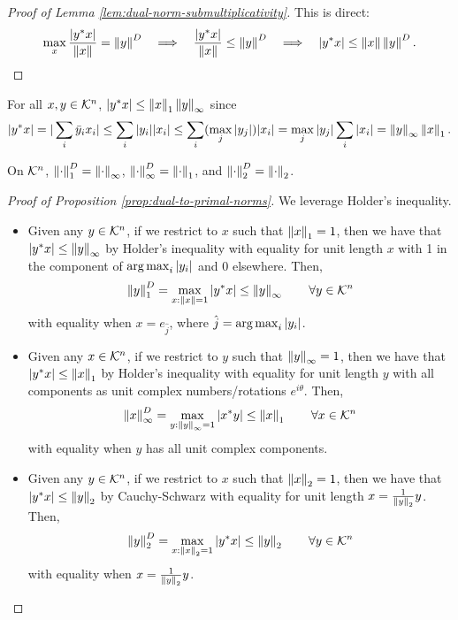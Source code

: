 \begin{proof}[Proof of Lemma \ref{lem:dual-norm-submultiplicativity}]
This is direct:
$$
\max_x \frac{|y^*x|}{\left\lVert x\right\rVert} = \left\lVert y\right\rVert^D \quad \Longrightarrow \quad \frac{|y^*x|}{\left\lVert x\right\rVert} \leq \left\lVert y\right\rVert^D \quad \Longrightarrow \quad |y^*x| \leq \left\lVert x\right\rVert\left\lVert y\right\rVert^D.
$$
\end{proof}

\begin{fact}
\label{fact:holders-inequality}
For all $x,y \in \mathcal{K}^n$, $|y^*x| \leq \left\lVert x\right\rVert_1 \left\lVert y\right\rVert_\infty$ since 
$$
|y^*x| = |\sum_{i}\Bar{y}_ix_i| \leq \sum_{i}|y_i||x_i| \leq \sum_i (\max_j |y_j|)|x_i| = \max_j|y_j| \sum_i |x_i| = \left\lVert y\right\rVert_\infty \left\lVert x\right\rVert_1.
$$
\end{fact}

\begin{proposition}
\label{prop:dual-to-primal-norms}
On $\mathcal{K}^n$, $\left\lVert\cdot\right\rVert_1^D = \left\lVert\cdot\right\rVert_\infty$, $\left\lVert\cdot\right\rVert_\infty^D = \left\lVert\cdot\right\rVert_1$, and $\left\lVert\cdot\right\rVert_2^D = \left\lVert\cdot\right\rVert_2$.
\end{proposition}

\begin{proof}[Proof of Proposition \ref{prop:dual-to-primal-norms}]
We leverage Holder's inequality.
\begin{itemize}
    \item Given any $y \in \mathcal{K}^n$, if we restrict to $x$ such that $\left\lVert x\right\rVert_1 = 1$, then we have that $|y^*x| \leq \left\lVert y\right\rVert_\infty$ by Holder's inequality with equality for unit length $x$ with 1 in the component of $\operatorname*{arg\,max}_i |y_i|$ and 0 elsewhere. Then,
    $$
    \left\lVert y\right\rVert_1^D = \max_{x: \left\lVert x\right\rVert = 1} |y^*x| \leq \left\lVert y\right\rVert_\infty \quad \quad \forall y \in \mathcal{K}^n
    $$
    with equality when $x = e_{\hat{j}}$, where $\hat{j} = \operatorname*{arg\,max}_i |y_i|$.
    \item Given any $x \in \mathcal{K}^n$, if we restrict to $y$ such that $\left\lVert y\right\rVert_\infty = 1$, then we have that $|y^*x| \leq \left\lVert x\right\rVert_1$ by Holder's inequality with equality for unit length $y$ with all components as unit complex numbers/rotations $e^{i\theta}$. Then,
    $$
    \left\lVert x\right\rVert_\infty^D = \max_{y: \left\lVert y\right\rVert_\infty = 1} |x^*y| \leq \left\lVert x\right\rVert_1 \quad \quad \forall x \in \mathcal{K}^n
    $$
    with equality when $y$ has all unit complex components.
    \item Given any $y \in \mathcal{K}^n$, if we restrict to $x$ such that $\left\lVert x\right\rVert_2 = 1$, then we have that $|y^*x| \leq \left\lVert y\right\rVert_2$ by Cauchy-Schwarz with equality for unit length $x = \frac{1}{\left\lVert y\right\rVert_2}y$. Then,
    $$
    \left\lVert y\right\rVert_2^D = \max_{x: \left\lVert x\right\rVert_2 = 1} |y^*x| \leq \left\lVert y\right\rVert_2 \quad \quad \forall y \in \mathcal{K}^n
    $$
    with equality when $x = \frac{1}{\left\lVert y\right\rVert_2}y$.
\end{itemize}
\end{proof}

